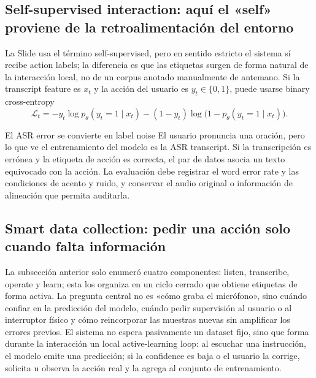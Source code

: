 \subsection{Self-supervised interaction: aquí el «self» proviene de la retroalimentación del entorno}

La Slide usa el término self-supervised, pero en sentido estricto el sistema sí recibe action labels; la diferencia es que las etiquetas surgen de forma natural de la interacción local, no de un corpus anotado manualmente de antemano. Si la transcript feature es $x_t$ y la acción del usuario es $y_t\in\{0,1\}$, puede usarse binary cross-entropy
\[
\mathcal L_t=-y_t\log p_\theta(y_t=1\mid x_t)
-(1-y_t)\log\bigl(1-p_\theta(y_t=1\mid x_t)\bigr).
\]


\begin{warningbox}{El ASR error se convierte en label noise}
El usuario pronuncia una oración, pero lo que ve el entrenamiento del modelo es la ASR transcript. Si la transcripción es errónea y la etiqueta de acción es correcta, el par de datos asocia un texto equivocado con la acción. La evaluación debe registrar el word error rate y las condiciones de acento y ruido, y conservar el audio original o información de alineación que permita auditarla.
\end{warningbox}

\subsection{Smart data collection: pedir una acción solo cuando falta información}

La subsección anterior solo enumeró cuatro componentes: listen, transcribe, operate y learn; esta los organiza en un ciclo cerrado que obtiene etiquetas de forma activa. La pregunta central no es «cómo graba el micrófono», sino cuándo confiar en la predicción del modelo, cuándo pedir supervisión al usuario o al interruptor físico y cómo reincorporar las muestras nuevas sin amplificar los errores previos. El sistema no espera pasivamente un dataset fijo, sino que forma durante la interacción un local active-learning loop: al escuchar una instrucción, el modelo emite una predicción; si la confidence es baja o el usuario la corrige, solicita u observa la acción real y la agrega al conjunto de entrenamiento.

